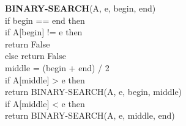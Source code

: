 \documentclass{article}
\begin{document}
\noindent\textbf{BINARY-SEARCH}(A, e, begin, end)\\
\indent if begin == end then\\
\indent \indent if A[begin] != e then \\
\indent \indent \indent return False\\
\indent \indent else return False\\
\indent middle = (begin + end) / 2\\
\indent if A[middle] > e then \\
\indent \indent \indent return BINARY-SEARCH(A, e, begin, middle)\\
\indent if A[middle] < e then\\
\indent \indent \indent return BINARY-SEARCH(A, e, middle, end)\\
\end{document}
